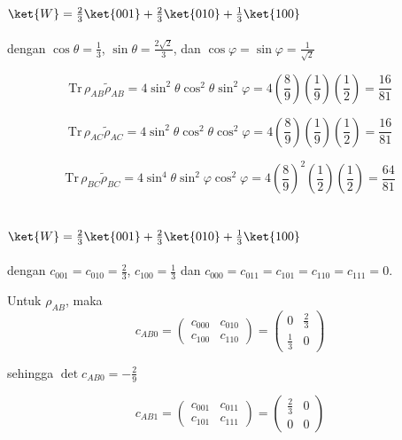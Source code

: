 \subsection{ $\ket{W}=\frac{2}{3}\ket{001}+\frac{2}{3}\ket{010}+\frac{1}{3}\ket{100}$}
dengan $\cos\theta=\frac{1}{3}$, $\sin\theta=\frac{2\sqrt{2}}{3}$, dan $\cos\varphi=\sin\varphi=\frac{1}{\sqrt{2}}$

\begin{equation}
	\mathrm{Tr}\,\rho_{AB}\tilde{\rho}_{AB}=4\sin^2\theta \cos^2\theta \sin^2\varphi=4(\frac{8}{9})(\frac{1}{9})(\frac{1}{2})=\frac{16}{81}
\end{equation}

\begin{equation}
	\mathrm{Tr}\,\rho_{AC}\tilde{\rho}_{AC}=4\sin^2\theta \cos^2\theta \cos^2\varphi=4(\frac{8}{9})(\frac{1}{9})(\frac{1}{2})=\frac{16}{81}
\end{equation}

\begin{equation}
	\mathrm{Tr}\,\rho_{BC}\tilde{\rho}_{BC}=4\sin^4\theta \sin^2\varphi\cos^2\varphi=4(\frac{8}{9})^2(\frac{1}{2})(\frac{1}{2})=\frac{64}{81}
\end{equation}

\subsection{ $\ket{W}=\frac{2}{3}\ket{001}+\frac{2}{3}\ket{010}+\frac{1}{3}\ket{100}$}
dengan $c_{001}=c_{010}=\frac{2}{3}$, $c_{100}=\frac{1}{3}$ dan $c_{000}=c_{011}=c_{101}=c_{110}=c_{111}=0$.

Untuk $\rho_{AB}$, maka
\begin{equation}
	c_{AB0}=
	\begin{pmatrix}
		c_{000} & c_{010} \\
		c_{100} & c_{110}
	\end{pmatrix}=
	\begin{pmatrix}
		0 & \frac{2}{3} \\
		\frac{1}{3} & 0
	\end{pmatrix}
\end{equation}

sehingga $\det c_{AB0} = -\frac{2}{9}$

\begin{equation}
	c_{AB1}=
	\begin{pmatrix}
		c_{001} & c_{011} \\
		c_{101} & c_{111}
	\end{pmatrix}=
	\begin{pmatrix}
		\frac{2}{3} & 0 \\
		0 & 0
	\end{pmatrix}
\end{equation}

